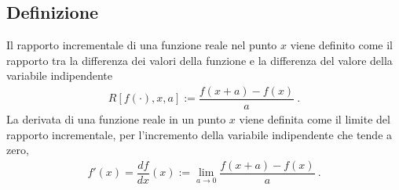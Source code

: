 \documentclass[letterpaper,10pt,italian]{jupyterBook}
\begin{document}
\subsection{Definizione}
\label{\detokenize{ch/infinitesimal_calculus/derivatives:definizione}}\label{\detokenize{ch/infinitesimal_calculus/derivatives:infinitesimal-calculus-derivatives-def}}
\sphinxAtStartPar
{} Il rapporto incrementale di una funzione reale nel punto \(x\) viene definito come il rapporto tra la differenza dei valori della funzione e la differenza del valore della variabile indipendente
\begin{equation}\label{equation:ch/infinitesimal_calculus/derivatives:eq:infinitesimal-calculus:derivatives:def_delta}
\begin{split}R[f(\cdot), x, a] := \dfrac{f(x+a)-f(x)}{a} \ .\end{split}
\end{equation}
\sphinxAtStartPar
{} La derivata di una funzione reale in un punto \(x\) viene definita come il limite del rapporto incrementale, per l’incremento della variabile indipendente che tende a zero,
\begin{equation}\label{equation:ch/infinitesimal_calculus/derivatives:eq:infinitesimal-calculus:derivatives:def}
\begin{split}f'(x) = \dfrac{d f}{d x}(x) := \lim_{a \rightarrow 0} \dfrac{f(x+a)-f(x)}{a} \ .\end{split}
\end{equation}
\sphinxAtStartPar
{} 
\end{document}
